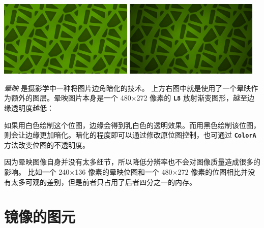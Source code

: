 \documentclass[10pt]{book}
\newcommand{\mach}[1]{\texttt{\textbf{#1}}}
\newcommand{\term}[1]{\emph{#1}\index{#1}}
\begin{document}
\begin{CJK}{UTF8}{gkai}
\begin{center}
\includegraphics[width=0.48\textwidth]{assets/vignette-0.png}
\includegraphics[width=0.48\textwidth]{assets/vignette-1.png}
\end{center}

\term{晕映} 是摄影学中一种将图片边角暗化的技术。
上方右图中就是使用了一个晕映作为额外的图层。晕映图片本身是一个 480$\times$272 像素的 \mach{L8} 放射渐变图形，越至边缘透明度越低：

\begin{center}
\setlength{\fboxsep}{0pt}
\setlength{\fboxrule}{1pt}
\end{center}

如果用白色绘制这个位图，边缘会得到乳白色的透明效果。而用黑色绘制该位图，则会让边缘更加暗化。暗化的程度即可以通过修改原位图控制，也可通过 \mach{ColorA} 方法改变位图的不透明度。


因为晕映图像自身并没有太多细节，所以降低分辨率也不会对图像质量造成很多的影响。
比如一个 240$\times$136 像素的晕映位图和一个 480$\times$272 像素的位图相比并没有太多可观的差别，但是前者只占用了后者四分之一的内存。

\newpage
\section{镜像的图元}
\label{mirror}


\end{CJK}
\end{document}
